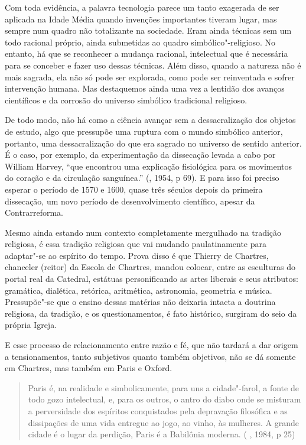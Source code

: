 Com toda evidência, a palavra tecnologia parece um tanto exagerada de
ser aplicada na Idade Média quando invenções importantes tiveram lugar,
mas sempre num quadro não totalizante na sociedade. Eram ainda técnicas
sem um todo racional próprio, ainda submetidas ao quadro
simbólico"-religioso. No entanto, há que se reconhecer a mudança
racional, intelectual que é necessária para se conceber e fazer uso
dessas técnicas. Além disso, quando a natureza não é mais sagrada, ela
não só pode ser explorada, como pode ser reinventada e sofrer
intervenção humana. Mas destaquemos ainda uma vez a lentidão dos avanços
científicos e da corrosão do universo simbólico tradicional religioso.

De todo modo, não há como a ciência avançar sem a dessacralização dos
objetos de estudo, algo que pressupõe uma ruptura com o mundo simbólico
anterior, portanto, uma dessacralização do que era sagrado no universo
de sentido anterior. É o caso, por exemplo, da experimentação da
dissecação levada a cabo por William Harvey, ``que encontrou uma
explicação fisiológica para os movimentos do coração e da circulação
sanguínea.'' (, 1954, p 69). E para isso foi preciso esperar o
período de 1570 e 1600, quase três séculos depois da primeira
dissecação, um novo período de desenvolvimento científico, apesar da
Contrarreforma.

Mesmo ainda estando num contexto completamente mergulhado na tradição
religiosa, é essa tradição religiosa que vai mudando paulatinamente para
adaptar"-se ao espírito do tempo. Prova disso é que Thierry de Chartres,
chanceler (reitor) da Escola de Chartres, mandou colocar, entre as
esculturas do portal real da Catedral, estátuas personificando as artes
liberais e seus atributos: gramática, dialética, retórica, aritmética,
astronomia, geometria e música. Pressupõe"-se que o ensino dessas
matérias não deixaria intacta a doutrina religiosa, da tradição, e os
questionamentos, é fato histórico, surgiram do seio da própria Igreja.

E esse processo de relacionamento entre razão e fé, que não tardará a
dar origem a tensionamentos, tanto subjetivos quanto também objetivos,
não se dá somente em Chartres, mas também em Paris e Oxford.

\begin{quote}
Paris é, na realidade e simbolicamente, para uns a cidade"-farol, a fonte
de todo gozo intelectual, e, para os outros, o antro do diabo onde se
misturam a perversidade dos espíritos conquistados pela depravação
filosófica e as dissipações de uma vida entregue ao jogo, ao vinho, às
mulheres. A grande cidade é o lugar da perdição, Paris é a Babilônia
moderna. ( , 1984, p 25)
\end{quote}

